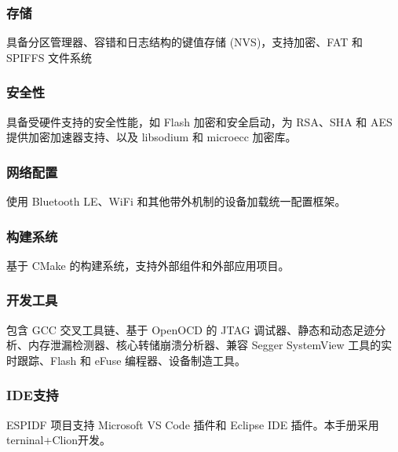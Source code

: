 \documentclass[a4paper,12pt,english]{sphinxmanual}
\begin{document}
\subsubsection{存储}
\label{\detokenize{dev-board/esp-idf:id11}}
\sphinxAtStartPar
具备分区管理器、容错和日志结构的键值存储 (NVS)，支持加密、FAT 和 SPIFFS 文件系统


\subsubsection{安全性}
\label{\detokenize{dev-board/esp-idf:id12}}
\sphinxAtStartPar
具备受硬件支持的安全性能，如 Flash 加密和安全启动，为 RSA、SHA 和 AES 提供加密加速器支持、以及 libsodium 和 micro\sphinxhyphen{}ecc 加密库。


\subsubsection{网络配置}
\label{\detokenize{dev-board/esp-idf:id13}}
\sphinxAtStartPar
使用 Bluetooth LE、Wi\sphinxhyphen{}Fi 和其他带外机制的设备加载统一配置框架。


\subsubsection{构建系统}
\label{\detokenize{dev-board/esp-idf:id14}}
\sphinxAtStartPar
基于 CMake 的构建系统，支持外部组件和外部应用项目。


\subsubsection{开发工具}
\label{\detokenize{dev-board/esp-idf:id15}}
\sphinxAtStartPar
包含 GCC 交叉工具链、基于 OpenOCD 的 JTAG 调试器、静态和动态足迹分析、内存泄漏检测器、核心转储崩溃分析器、兼容 Segger SystemView 工具的实时跟踪、Flash 和 eFuse 编程器、设备制造工具。


\subsubsection{IDE支持}
\label{\detokenize{dev-board/esp-idf:ide}}
\sphinxAtStartPar
ESP\sphinxhyphen{}IDF 项目支持 Microsoft VS Code 插件和 Eclipse IDE 插件。本手册采用terninal+Clion开发。
\end{document}
